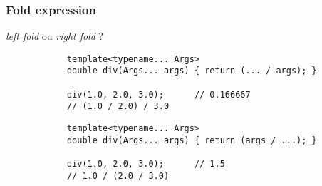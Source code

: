 \documentclass[C++.tex]{subfiles}
\begin{document}
\begin{frame}[fragile]
\end{frame}

\begin{frame}[fragile]
	\frametitle{Fold expression}
	\begin{alertblock}{\textit{left fold} ou \textit{right fold} ?}
		\begin{verbatim}
			template<typename... Args>
			double div(Args... args) { return (... / args); }

			div(1.0, 2.0, 3.0);      // 0.166667
			// (1.0 / 2.0) / 3.0
		\end{verbatim}

		\begin{verbatim}
			template<typename... Args>
			double div(Args... args) { return (args / ...); }

			div(1.0, 2.0, 3.0);      // 1.5
			// 1.0 / (2.0 / 3.0)
		\end{verbatim}
	\end{alertblock}


\end{frame}
\end{document}
